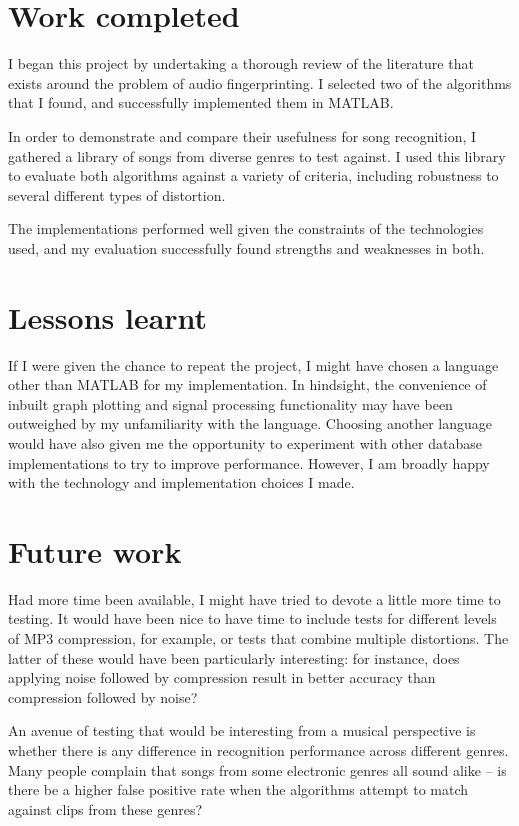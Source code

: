 \documentclass[12pt,a4paper,twoside,openright]{report}
\begin{document}
\section{Work completed}

I began this project by undertaking a thorough review of the literature that exists around the problem of audio fingerprinting. I selected two of the algorithms that I found, and successfully implemented them in MATLAB.

In order to demonstrate and compare their usefulness for song recognition, I gathered a library of songs from diverse genres to test against. I used this library to evaluate both algorithms against a variety of criteria, including robustness to several different types of distortion.

The implementations performed well given the constraints of the technologies used, and my evaluation successfully found strengths and weaknesses in both.

\section{Lessons learnt}

If I were given the chance to repeat the project, I might have chosen a language other than MATLAB for my implementation. In hindsight, the convenience of inbuilt graph plotting and signal processing functionality may have been outweighed by my unfamiliarity with the language. Choosing another language would have also given me the opportunity to experiment with other database implementations to try to improve performance. However, I am broadly happy with the technology and implementation choices I made.

\section{Future work}

Had more time been available, I might have tried to devote a little more time to testing. It would have been nice to have time to include tests for different levels of MP3 compression, for example, or tests that combine multiple distortions. The latter of these would have been particularly interesting: for instance, does applying noise followed by compression result in better accuracy than compression followed by noise?

An avenue of testing that would be interesting from a musical perspective is whether there is any difference in recognition performance across different genres. Many people complain that songs from some electronic genres all sound alike -- is there be a higher false positive rate when the algorithms attempt to match against clips from these genres?
\end{document}
